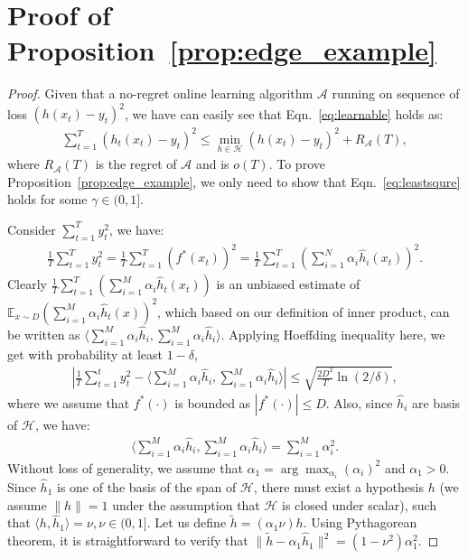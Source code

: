 \section{Proof of Proposition~\ref{prop:edge_example}}
\begin{proof}
Given that a no-regret online learning algorithm $\mathcal{A}$ running on sequence of loss $(h(x_t) - y_t)^2$, we have can easily see that Eqn.~\ref{eq:learnable} holds as:
\begin{align}
\label{eq:no_regret}
\sum_{t=1}^T(h_t(x_t) - y_t)^2\leq \min_{h\in\mathcal{H}}(h(x_t) - y_t)^2 + R_{\mathcal{A}}(T), 
\end{align}where $R_{\mathcal{A}}(T)$ is the regret of $\mathcal{A}$ and is $o(T)$. To prove Proposition~\ref{prop:edge_example}, we only need to show that Eqn.~\ref{eq:leastsqure} holds for some $\gamma\in(0,1]$. 

Consider $\sum_{t=1}^T y_t^2$, we have:
\begin{align}
\frac{1}{T}\sum_{t=1}^T y_t^2 = \frac{1}{T}\sum_{t=1}^T (f^*(x_t))^2 =  \frac{1}{T}\sum_{t=1}^T (\sum_{i=1}^N\alpha_i \hat{h}_i(x_t))^2.
\end{align} Clearly $\frac{1}{T}\sum_{t=1}^T (\sum_{i=1}^M\alpha_i\hat{h}_t(x_t))$ is an unbiased estimate of $\mathbb{E}_{x\sim D}(\sum_{i=1}^M\alpha_i \hat{h}_t(x))^2$, which based on our definition of inner product, can be written as $\langle \sum_{i=1}^M \alpha_i\hat{h}_i, \sum_{i=1}^M\alpha_i\hat{h}_i \rangle$. Applying Hoeffding inequality here, we get with probability at least $1-\delta$,
\begin{align}
\label{eq:high_prob_1}
|\frac{1}{T}\sum_{t=1}^t y_t^2 - \langle\sum_{i=1}^M \alpha_i\hat{h}_i, \sum_{i=1}^M\alpha_i\hat{h}_i\rangle| \leq \sqrt{\frac{2D^2}{T}\ln(2/\delta)},
\end{align} where we assume that $f^*(\cdot)$ is bounded as $|f^*(\cdot)|\leq D$. Also, since $\hat{h}_i$ are basis of $\mathcal{H}$, we have:
\begin{align}
\langle \sum_{i=1}^M \alpha_i\hat{h}_i, \sum_{i=1}^M\alpha_i\hat{h}_i \rangle = \sum_{i=1}^M \alpha_i^2. 
\end{align}
Without loss of generality, we assume that $\alpha_1 = \arg\max_{\alpha_i} (\alpha_i)^2$ and $\alpha_1 > 0$. Since $\hat{h}_1$ is one of the basis of the span of $\mathcal{H}$, there must exist a hypothesis ${h}$ (we assume $\|{h}\| = 1$ under the assumption that $\mathcal{H}$ is closed under scalar), such that $\langle{h}, \hat{h}_1\rangle = \nu, \nu\in (0,1]$. Let us define $\tilde{h} = (\alpha_1\nu) h$. Using Pythagorean theorem, it is straightforward to verify that $\|\tilde{h} - \alpha_1\hat{h}_1\|^2 = (1-\nu^2)\alpha_1^2$.


\end{proof}

